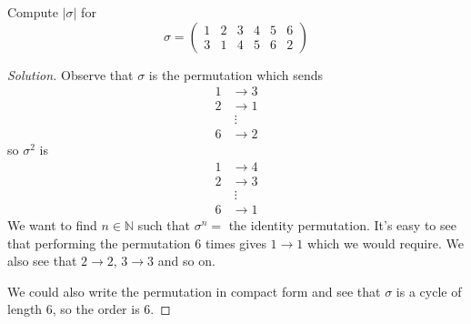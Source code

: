 \begin{prob}
    Compute $|\sigma|$ for 
    \[
        \sigma = 
        \begin{pmatrix}
            1 & 2 & 3 & 4 & 5 & 6 \\ 
            3 & 1 & 4 & 5 & 6 & 2
        \end{pmatrix}
    \]
\end{prob}
\begin{proof}[Solution]
    Observe that $\sigma$ is the permutation which sends 
    \begin{align*}
        1 &\to 3 \\ 
        2 &\to 1 \\ 
        & \ \vdots \\ 
        6 &\to 2
    \end{align*}
    so $\sigma^2$ is 
    \begin{align*}
        1 &\to 4 \\ 
        2 &\to 3 \\ 
          & \ \vdots \\ 
        6 &\to 1
    \end{align*}
    We want to find $n \in \mathbb N$ such that 
    $\sigma^n = $ the identity permutation. 
    It's easy to see that performing the permutation $6$ times 
    gives $1 \to 1$ which we would require. We also see that 
    $2 \to 2$, $3 \to 3$ and so on. 

    We could also write the permutation in compact form and see 
    that $\sigma$ is a cycle of length $6$, so the order is $6$. 
\end{proof}

